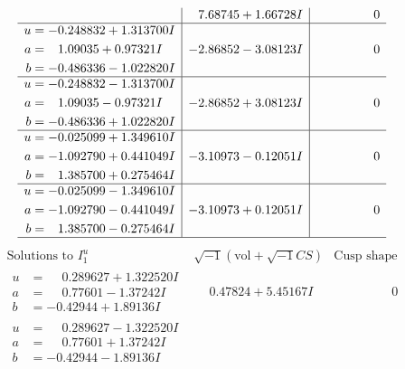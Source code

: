 \documentclass[1p]{elsarticle_modified}
\theoremstyle{definition}
\newcommand{\I}{\sqrt{-1}}
\begin{document}
$$\begin{array}{c|c|c}
 & \phantom{-}7.68745 + 1.66728 I & \phantom{-0.000000 } 0 \\ \hline\begin{aligned}
u &= -0.248832 + 1.313700 I \\
a &= \phantom{-}1.09035 + 0.97321 I \\
b &= -0.486336 - 1.022820 I\end{aligned}
 & -2.86852 - 3.08123 I & \phantom{-0.000000 } 0 \\ \hline\begin{aligned}
u &= -0.248832 - 1.313700 I \\
a &= \phantom{-}1.09035 - 0.97321 I \\
b &= -0.486336 + 1.022820 I\end{aligned}
 & -2.86852 + 3.08123 I & \phantom{-0.000000 } 0 \\ \hline\begin{aligned}
u &= -0.025099 + 1.349610 I \\
a &= -1.092790 + 0.441049 I \\
b &= \phantom{-}1.385700 + 0.275464 I\end{aligned}
 & -3.10973 - 0.12051 I & \phantom{-0.000000 } 0 \\ \hline\begin{aligned}
u &= -0.025099 - 1.349610 I \\
a &= -1.092790 - 0.441049 I \\
b &= \phantom{-}1.385700 - 0.275464 I\end{aligned}
 & -3.10973 + 0.12051 I & \phantom{-0.000000 } 0\\
 \hline 
 \end{array}$$\newpage$$\begin{array}{c|c|c}  
\text{Solutions to }I^u_{1}& \I (\text{vol} + \sqrt{-1}CS) & \text{Cusp shape}\\
 \hline 
\begin{aligned}
u &= \phantom{-}0.289627 + 1.322520 I \\
a &= \phantom{-}0.77601 - 1.37242 I \\
b &= -0.42944 + 1.89136 I\end{aligned}
 & \phantom{-}0.47824 + 5.45167 I & \phantom{-0.000000 } 0 \\ \hline\begin{aligned}
u &= \phantom{-}0.289627 - 1.322520 I \\
a &= \phantom{-}0.77601 + 1.37242 I \\
b &= -0.42944 - 1.89136 I\end{aligned}

\end{array}$$
\end{document}
